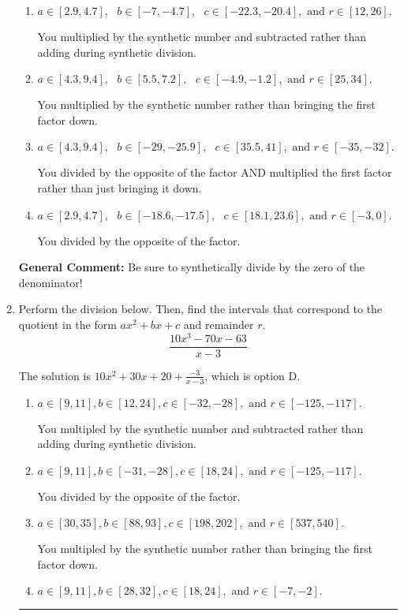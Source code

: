 \documentclass{extbook}[14pt]
\newcommand{\litem}[1]{\item #1

\rule{\textwidth}{0.4pt}}
\begin{document}
\begin{enumerate}
{\begin{enumerate}[label=\Alph*.]
* This is the solution!
\item \( a \in [2.9, 4.7], \text{   } b \in [-7, -4.7], \text{   } c \in [-22.3, -20.4], \text{   and   } r \in [12, 26]. \)

 You multiplied by the synthetic number and subtracted rather than adding during synthetic division.
\item \( a \in [4.3, 9.4], \text{   } b \in [5.5, 7.2], \text{   } c \in [-4.9, -1.2], \text{   and   } r \in [25, 34]. \)

 You multiplied by the synthetic number rather than bringing the first factor down.
\item \( a \in [4.3, 9.4], \text{   } b \in [-29, -25.9], \text{   } c \in [35.5, 41], \text{   and   } r \in [-35, -32]. \)

 You divided by the opposite of the factor AND multiplied the first factor rather than just bringing it down.
\item \( a \in [2.9, 4.7], \text{   } b \in [-18.6, -17.5], \text{   } c \in [18.1, 23.6], \text{   and   } r \in [-3, 0]. \)

 You divided by the opposite of the factor.
\end{enumerate}

\textbf{General Comment:} Be sure to synthetically divide by the zero of the denominator!
}
\litem{
Perform the division below. Then, find the intervals that correspond to the quotient in the form $ax^2+bx+c$ and remainder $r$.
\[ \frac{10x^{3} -70 x -63}{x -3} \]

The solution is \( 10x^{2} +30 x + 20 + \frac{-3}{x -3} \), which is option D.\begin{enumerate}[label=\Alph*.]
\item \( a \in [9, 11], b \in [12, 24], c \in [-32, -28], \text{ and } r \in [-125, -117]. \)

 You multipled by the synthetic number and subtracted rather than adding during synthetic division.
\item \( a \in [9, 11], b \in [-31, -28], c \in [18, 24], \text{ and } r \in [-125, -117]. \)

 You divided by the opposite of the factor.
\item \( a \in [30, 35], b \in [88, 93], c \in [198, 202], \text{ and } r \in [537, 540]. \)

 You multipled by the synthetic number rather than bringing the first factor down.
\item \( a \in [9, 11], b \in [28, 32], c \in [18, 24], \text{ and } r \in [-7, -2]. \)


\end{enumerate}}
\end{enumerate}
\end{document}
